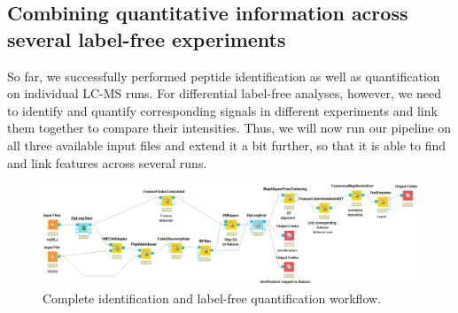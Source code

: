 \subsection{Combining quantitative information across several label-free experiments}
\label{Combining}

So far, we successfully performed peptide identification as well as quantification on individual LC-MS runs. For differential label-free analyses, however, we need to identify and quantify corresponding signals in different experiments and link them together to compare their intensities. Thus, we will now run our pipeline on all three available input files and extend it a bit further, so that it is able to find and link features across several runs.

\begin{figure}[htbp]
  \centering
  \includegraphics[width=\textwidth]{graphics/labelfree/PepQuantId.png}
  \caption{Complete identification and label-free quantification workflow.}
  \label{fig:complete_without_consensusid}
\end{figure}

